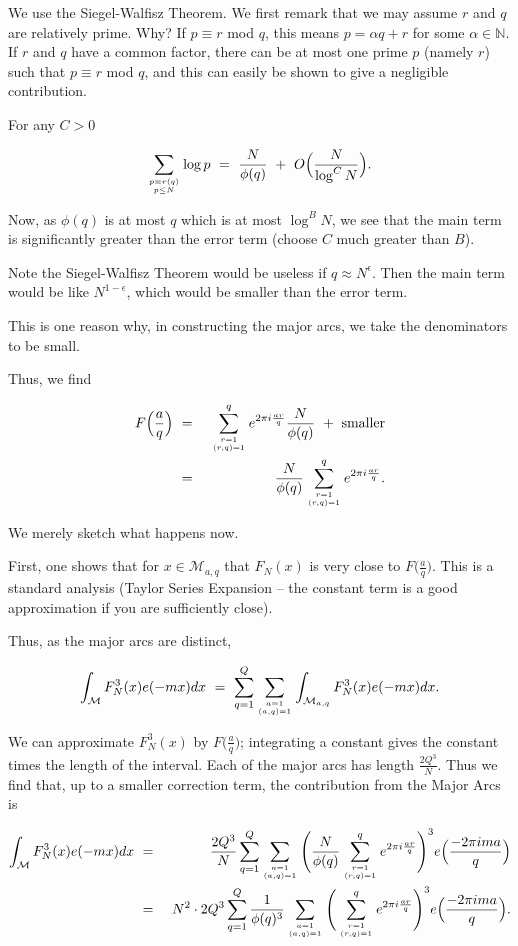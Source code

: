 \documentclass[12pt,letterpaper]{report}
\newcommand\be{\begin{equation}}
\newcommand\ee{\end{equation}}
\newcommand\bea{\begin{eqnarray}}
\newcommand\eea{\end{eqnarray}}
\newcommand{\N}{\mathbb{N}}
\begin{document}
We use the Siegel-Walfisz Theorem. We first remark that we may
assume $r$ and $q$ are relatively prime. Why? If $p \equiv r$ mod
$q$, this means $p = \alpha q + r$ for some $\alpha \in \N$. If
$r$ and $q$ have a common factor, there can be at most one prime
$p$ (namely $r$) such that $p \equiv r$ mod $q$, and this can
easily be shown to give a negligible contribution.

For any $C > 0$

\be \sum_{ {p \equiv r (q)} \atop {p \le N} } \log p \ = \
\frac{N}{\phi(q)} \ + \ O\Big( \frac{N}{\log^C N} \Big). \ee

Now, as $\phi(q)$ is at most $q$ which is at most $\log^B N$, we
see that the main term is significantly greater than the error
term (choose $C$ much greater than $B$).

Note the Siegel-Walfisz Theorem would be useless if $q \approx
N^\epsilon$. Then the main term would be like $N^{1 - \epsilon}$,
which would be smaller than the error term.

This is one reason why, in constructing the major arcs, we take
the denominators to be small.

Thus, we find

\bea F\Big(\frac{a}{q}\Big) &\ = \  & \sum_{ {r=1} \atop {(r,q)=1}
}^q e^{2\pi i \frac{ar}{q} } \frac{N}{\phi(q)} \ + \
\text{smaller} \nonumber\\ &\ = \  &  \frac{N}{\phi(q)} \sum_{
{r=1} \atop {(r,q)=1} }^q e^{2\pi i \frac{ar}{q} }. \eea


We merely sketch what happens now.

First, one shows that for $x \in \mathcal{M}_{a,q}$ that $F_N(x)$
is very close to $F\Big(\frac{a}{q}\Big)$. This is a standard
analysis (Taylor Series Expansion -- the constant term is a good
approximation if you are sufficiently close).

Thus, as the major arcs are distinct,

\be \int_{\mathcal{M}} F_N^3(x) e(-mx)dx \ = \ \sum_{q=1}^Q \sum_{
{a=1} \atop {(a,q)=1} } \int_{ \mathcal{M}_{a,q} } F_N^3(x)
e(-mx)dx. \ee

We can approximate $F_N^3(x)$ by $F\Big(\frac{a}{q}\Big)$;
integrating a constant gives the constant times the length of the
interval. Each of the major arcs has length $\frac{2Q^3}{N}$. Thus
we find that, up to a smaller correction term, the contribution
from the Major Arcs is

\bea \int_{\mathcal{M}} F_N^3(x) e(-mx)dx & \ = \ & \frac{2Q^3}{N}
\sum_{q=1}^Q \sum_{ {a=1} \atop {(a,q)=1} } \Bigg(
\frac{N}{\phi(q)} \sum_{ {r=1} \atop {(r,q)=1} }^q e^{2\pi i
\frac{ar}{q} } \Bigg)^3 e\Big( \frac{-2\pi i ma}{q} \Big)
\nonumber\\ & \ = \ & N^2 \cdot 2Q^3 \sum_{q=1}^Q
\frac{1}{\phi(q)^3} \sum_{ {a=1} \atop {(a,q)=1} } \Bigg( \sum_{
{r=1} \atop {(r,q)=1} }^q e^{2\pi i \frac{ar}{q} } \Bigg)^3 e\Big(
\frac{-2\pi i ma}{q} \Big). \nonumber\\ & & \eea
\end{document}
